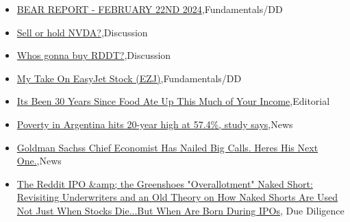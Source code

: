 \documentclass{article}%
\begin{document}
%
\begin{itemize}%
\item%
\href{https://reddit.com/r/StockMarket/comments/1axtshb/bear\_report\_february\_22nd\_2024/}{BEAR REPORT - FEBRUARY 22ND 2024},Fundamentals/DD%
\item%
\href{https://reddit.com/r/StockMarket/comments/1axja2k/sell\_or\_hold\_nvda/}{Sell or hold NVDA?},Discussion%
\item%
\href{https://reddit.com/r/StockMarket/comments/1axj00g/whos\_gonna\_buy\_rddt/}{Whos gonna buy RDDT?},Discussion%
\item%
\href{https://reddit.com/r/StockMarket/comments/1axiz54/my\_take\_on\_easyjet\_stock\_ezj/}{My Take On EasyJet Stock (EZJ)},Fundamentals/DD%
\item%
\href{https://reddit.com/r/Economics/comments/1axwz7x/its\_been\_30\_years\_since\_food\_ate\_up\_this\_much\_of/}{Its Been 30 Years Since Food Ate Up This Much of Your Income},Editorial%
\item%
\href{https://reddit.com/r/Economics/comments/1axk8et/poverty\_in\_argentina\_hits\_20year\_high\_at\_574/}{Poverty in Argentina hits 20-year high at 57.4\%, study says},News%
\item%
\href{https://reddit.com/r/Economics/comments/1axhecd/goldman\_sachss\_chief\_economist\_has\_nailed\_big/}{Goldman Sachss Chief Economist Has Nailed Big Calls. Heres His Next One.},News%
\item%
\href{https://reddit.com/r/Superstonk/comments/1axjbvc/the\_reddit\_ipo\_the\_greenshoes\_overallotment\_naked/}{The Reddit IPO \&amp; the Greenshoes "Overallotment" Naked Short: Revisiting Underwriters and an Old Theory on How Naked Shorts Are Used Not Just When Stocks Die...But When Are Born During IPOs}, Due Diligence%
\end{itemize}%
\end{document}
